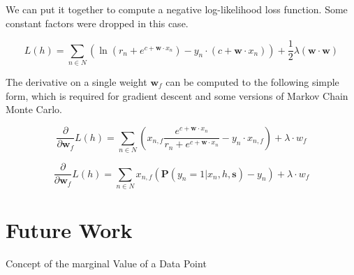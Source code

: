 \documentclass[twoside]{article}
\begin{document}
We can put it together to compute a negative log-likelihood loss function. Some constant factors were dropped in this case.

\[L(h)=\sum_{n \in  N} \left (\ln\left (r_n+e^{c+\mathbf{w} \cdot x_n}\right ) -y_n \cdot (c+\mathbf{w} \cdot x_n) \right )+ \frac{1}{2}\lambda(\mathbf{w} \cdot \mathbf{w})\]

The derivative on a single weight \(\mathbf{w}_f\) can be computed to the following simple form, which is required for gradient descent and some versions of Markov Chain Monte Carlo.

\[\frac{\partial}{\partial \mathbf{w}_f }L(h)=\sum_{n \in  N} \left(x_{n,f}\frac{e^{c+\mathbf{w} \cdot x_n}}{r_n+e^{c+\mathbf{w} \cdot x_n}} -y_n \cdot x_{n,f} \right )+ \lambda \cdot w_f\] 

\[\frac{\partial}{\partial \mathbf{w}_f }L(h)= \sum_{n \in  N} x_{n,f}\left(\mathbf{P}(y_n=1|x_n,h,\mathbf{s}) -y_n  \right )+ \lambda \cdot w_f \]

\section{Future Work}

Concept of the marginal Value of a Data Point
\end{document}
